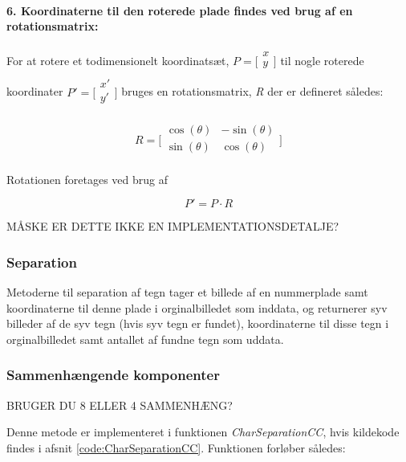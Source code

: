 \paragraph{6. Koordinaterne til den roterede plade findes ved brug af en rotationsmatrix:} For at rotere et todimensionelt koordinatsæt, $P=\biggl[\begin{array}{c} x\\ y\\ \end{array}\biggr]$ til nogle roterede koordinater $P'=\biggl[\begin{array}{c} x'\\ y'\\ \end{array}\biggr]$ bruges en rotationsmatrix, \textit{R} der er defineret således:

\begin{displaymath} 
R = 
\biggl[ \begin{array}{cc} 
\cos(\theta) & - \sin(\theta) \\
\sin(\theta) & \cos(\theta) \\
\end{array} \biggr] 
\end{displaymath}

Rotationen foretages ved brug af

\begin{displaymath}
P' = P \cdot R
\end{displaymath}

MÅSKE ER DETTE IKKE EN IMPLEMENTATIONSDETALJE?

\subsubsection{Separation}

Metoderne til separation af tegn tager et billede af en nummerplade samt koordinaterne til denne plade i orginalbilledet som inddata, og returnerer syv billeder af de syv tegn (hvis syv tegn er fundet), koordinaterne til disse tegn i orginalbilledet samt antallet af fundne tegn som uddata.

\subsubsection*{Sammenhængende komponenter}
BRUGER DU 8 ELLER 4 SAMMENHÆNG?

Denne metode er implementeret i funktionen \textit{CharSeparationCC}, hvis kildekode findes i afsnit \vref{code:CharSeparationCC}. Funktionen forløber således:

